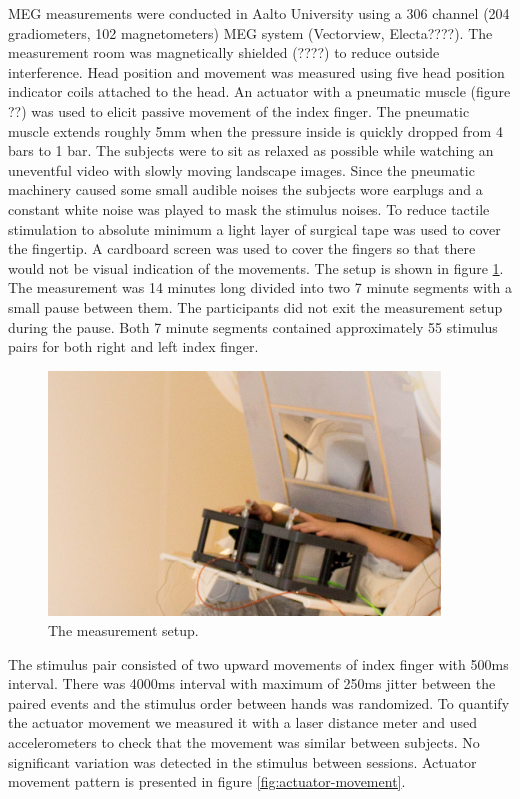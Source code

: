 \documentclass[]{article}
\begin{document}
MEG measurements were conducted in Aalto University using a 306 channel (204 gradiometers, 102 magnetometers) MEG system (Vectorview, Electa????). The measurement room was magnetically shielded (????) to reduce outside interference. Head position and movement was measured using five head position indicator coils attached to the head. An actuator with a pneumatic muscle (figure ??) was used to elicit passive movement of the index finger. The pneumatic muscle extends roughly 5mm when the pressure inside is quickly dropped from 4 bars to 1 bar. The subjects were to sit as relaxed as possible while watching an uneventful video with slowly moving landscape images. Since the pneumatic machinery caused some small audible noises the subjects wore earplugs and a constant white noise was played to mask the stimulus noises. To reduce tactile stimulation to absolute minimum a light layer of surgical tape was used to cover the fingertip. A cardboard screen was used to cover the fingers so that there would not be visual indication of the movements. The setup is shown in figure \ref{fig:setup}. The measurement was 14 minutes long divided into two 7 minute segments with a small pause between them. The participants did not exit the measurement setup during the pause. Both 7 minute segments contained approximately 55 stimulus pairs for both right and left index finger. 

\begin{figure}
    \centering
    \includegraphics[height=6.5cm]{images/setup.jpg}
    \caption{The measurement setup.}
    \label{fig:setup}
\end{figure}

The stimulus pair consisted of two upward movements of index finger with 500ms interval. There was 4000ms interval with maximum of 250ms jitter between the paired events and the stimulus order between hands was randomized. To quantify the actuator movement we measured it with a laser distance meter and used accelerometers to check that the movement was similar between subjects. No significant variation was detected in the stimulus between sessions. Actuator movement pattern is presented in figure \ref{fig:actuator-movement}. 
\end{document}
